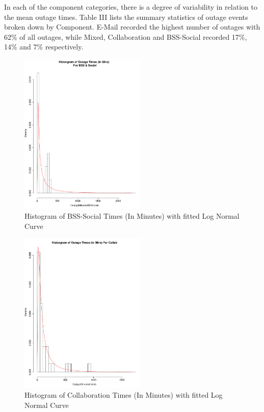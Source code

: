 \documentclass[conference]{IEEEtran}
\begin{document}
In each of the component categories, there is a degree of variability in relation to the mean outage times. Table III lists the summary statistics of outage events broken down by Component. E-Mail recorded the highest number of outages with 62\% of all outages, while Mixed, Collaboration and BSS-Social recorded 17\%, 14\% and 7\% respectively. 


\begin{figure}
\begin{center}
\includegraphics[width=6cm]{graph2.pdf} 
\caption{ Histogram of BSS-Social Times (In Minutes) with fitted Log Normal Curve}
\end{center}
\label{fig:outagedistribution}
\end{figure}


\begin{figure}
\begin{center}
\includegraphics[width=6cm]{graph3.pdf} 
\caption{ Histogram of Collaboration Times (In Minutes) with fitted Log Normal Curve}
\end{center}
\label{fig:outagedistribution}
\end{figure}
\end{document}
